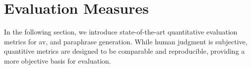 \section{Evaluation Measures}
\label{sec:evaluation_measures}

In the following section, we introduce state-of-the-art quantitative evaluation metrics for \ac{av}, and paraphrase generation. 
While human judgment is subjective, quantitive metrics are designed to be comparable and reproducible, providing a more objective basis for evaluation.





